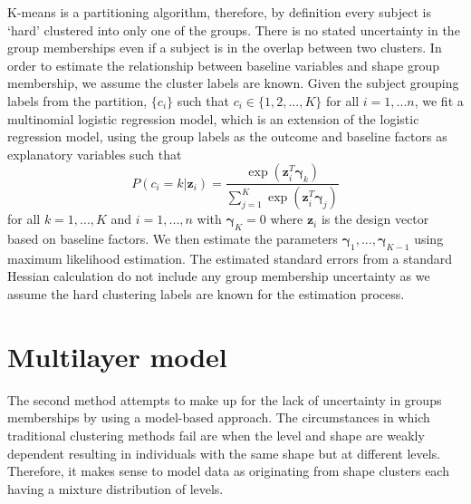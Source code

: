 \documentclass[12pt]{article}
\newcommand{\B}[0]{\mathbf}
\newcommand{\bs}[0]{\boldsymbol}
\begin{document}
K-means is a partitioning algorithm, therefore, by definition every subject is `hard' clustered into only one of the groups. There is no stated uncertainty in the group memberships even if a subject is in the overlap between two clusters. In order to estimate the relationship between baseline variables and shape group membership, we assume the cluster labels are known. Given the subject grouping labels from the partition, $\{c_{i}\}$ such that $c_{i}\in\{1,2,...,K\}$ for all $i=1,...n$, we fit a multinomial logistic regression model, which is an extension of the logistic regression model, using the group labels as the outcome and baseline factors as explanatory variables such that
$$P(c_{i} = k|\B z_{i}) = \frac{\exp(\B z_{i}^{T}\bs\gamma_{k})}{\sum_{j=1}^{K}\exp(\B z_{i}^{T}\bs\gamma_{j})}$$
for all $k=1,...,K$ and $i=1,...,n$ with $\bs\gamma_{K}=0$ where $\B z_{i}$ is the design vector based on baseline factors. We then estimate the parameters $\bs\gamma_{1},...,\bs\gamma_{K-1}$ using maximum likelihood estimation. The estimated standard errors from a standard Hessian calculation do not include any group membership uncertainty  as we assume the hard clustering labels are known for the estimation process.
\section{Multilayer model}
The second method attempts to make up for the lack of uncertainty in groups memberships by using a model-based approach. The circumstances in which traditional clustering methods fail are when the level and shape are weakly dependent resulting in individuals with the same shape but at different levels. Therefore, it makes sense to model data as originating from shape clusters each having a mixture distribution of levels.
\end{document}
